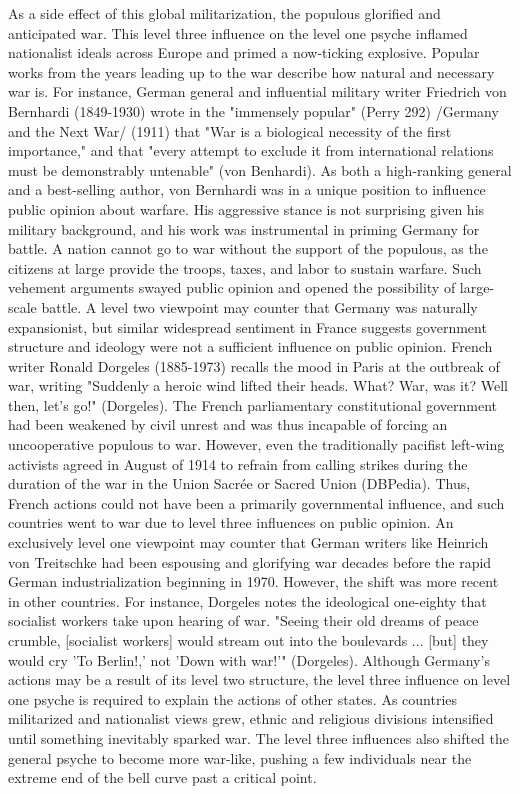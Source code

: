 \documentclass[11pt]{article}
\begin{document}
\begin{doublespacing}

As a side effect of this global militarization, the populous glorified and anticipated war. This level three influence on the level one psyche inflamed nationalist ideals across Europe and primed a now-ticking explosive.
Popular works from the years leading up to the war describe how natural and necessary war is.
For instance, German general and influential military writer Friedrich von Bernhardi (1849-1930) wrote in the "immensely popular" (Perry 292) /Germany and the Next War/ (1911) that "War is a biological necessity of the first importance," and that "every attempt to exclude it from international relations must be demonstrably untenable" (von Benhardi).
As both a high-ranking general and a best-selling author, von Bernhardi was in a unique position to influence public opinion about warfare. His aggressive stance is not surprising given his military background, and his work was instrumental in priming Germany for battle. A nation cannot go to war without the support of the populous, as the citizens at large provide the troops, taxes, and labor to sustain warfare. Such vehement arguments swayed public opinion and opened the possibility of large-scale battle.
A level two viewpoint may counter that Germany was naturally expansionist, but similar widespread sentiment in France suggests government structure and ideology were not a sufficient influence on public opinion. French writer Ronald Dorgeles (1885-1973) recalls the mood in Paris at the outbreak of war, writing "Suddenly a heroic wind lifted their heads. What? War, was it? Well then, let's go!" (Dorgeles).
The French parliamentary constitutional government had been weakened by civil unrest and was thus incapable of forcing an uncooperative populous to war. However, even the traditionally pacifist left-wing activists agreed in August of 1914 to refrain from calling strikes during the duration of the war in the Union Sacrée or Sacred Union (DBPedia). Thus, French actions could not have been a primarily governmental influence, and such countries went to war due to level three influences on public opinion.
An exclusively level one viewpoint may counter that German writers like Heinrich von Treitschke had been espousing and glorifying war decades before the rapid German industrialization beginning in 1970. However, the shift was more recent in other countries. For instance, Dorgeles notes the ideological one-eighty that socialist workers take upon hearing of war. "Seeing their old dreams of peace crumble, [socialist workers] would stream out into the boulevards ... [but] they would cry 'To Berlin!,' not 'Down with war!'" (Dorgeles). Although Germany's actions may be a result of its level two structure, the level three influence on level one psyche is required to explain the actions of other states.
As countries militarized and nationalist views grew, ethnic and religious divisions intensified until something inevitably sparked war.
The level three influences also shifted the general psyche to become more war-like, pushing a few individuals near the extreme end of the bell curve past a critical point.

	\end{doublespacing}
\end{document}
